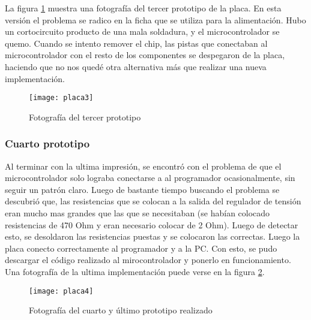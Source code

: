 La figura \ref{fig:placa3} muestra una fotografía del tercer prototipo de la placa. En esta versión el problema se radico en la ficha que se utiliza para la alimentación. Hubo un cortocircuito producto de una mala soldadura, y el microcontrolador se quemo. Cuando se intento remover el chip, las pistas que conectaban al microcontrolador con el resto de los componentes se despegaron de la placa, haciendo que no nos quedé otra alternativa más que realizar una nueva implementación. 
\begin{figure}[H]
  \centering
  \texttt{[image: placa3]}
  \caption{\small Fotografía del tercer prototipo}\label{fig:placa3}
\end{figure}



\subsubsection{Cuarto prototipo} %
\label{ssub:cuarto_prototipo}

Al terminar con la ultima impresión, se encontró con el problema de que el microcontrolador solo lograba conectarse a al programador ocasionalmente, sin seguir un patrón claro. Luego de bastante tiempo buscando el problema se descubrió que, las resistencias que se colocan a la salida del regulador de tensión eran mucho mas grandes que las que se necesitaban (se habían colocado resistencias de 470 Ohm y eran necesario colocar de 2 Ohm). Luego de detectar esto, se desoldaron las resistencias puestas y se colocaron las correctas. Luego la placa conecto correctamente al programador y a la PC. Con esto, se pudo descargar el código realizado al mirocontrolador y ponerlo en funcionamiento. Una fotografía de la ultima implementación puede verse en la figura \ref{fig:placa4}.
\begin{figure}[H]
  \centering
  \texttt{[image: placa4]}
  \caption{\small Fotografía del cuarto y último prototipo realizado}\label{fig:placa4}
\end{figure}


